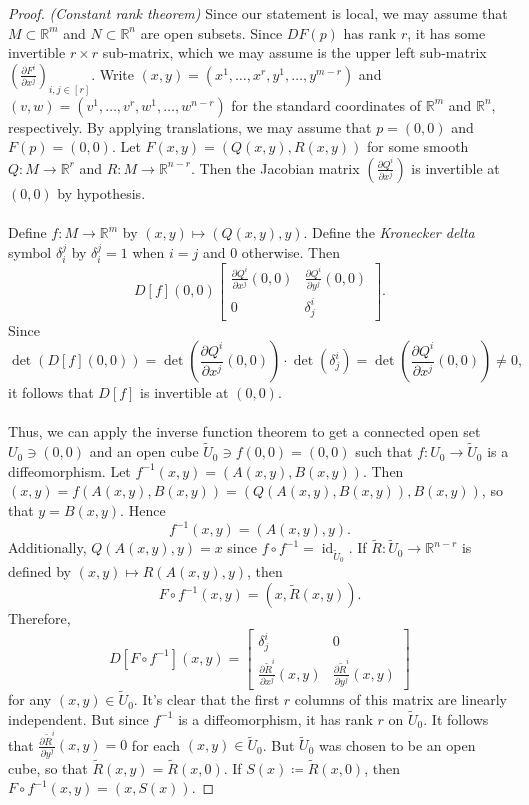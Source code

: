 \documentclass[10pt,letterpaper,cm]{nupset}
\theoremstyle{definition}
\theoremstyle{theorem}
\theoremstyle{remark}
\newcommand{\R}{\mathbb R}
\newcommand{\1}{\mathbf{1}}
\newcommand{\0}{\vec 0}
\DeclareMathOperator{\id}{id}
\begin{document}
\begin{proof}{\textit{(Constant rank theorem)}}
Since our statement is local, we may assume that $M\subset \R^m$ and $N\subset \R^n$ are open subsets. Since $DF(p)$ has rank $r$, it has some invertible $r\times r$ sub-matrix, which we may assume is the upper left sub-matrix $\left(\frac{\partial{F^i}}{\partial{x^j}}\right)_{i,j\in [r]}$. Write $(x,y) = (x^1, \ldots, x^r, y^1, \ldots, y^{m-r})$ and $(v,w) = (v^1, \ldots, v^r, w^1, \ldots, w^{n-r})$ for the standard coordinates of $\R^m$ and $\R^n$, respectively. By applying translations, we may assume that $p=(0,0)$ and $F(p)= (0,0)$. Let $F(x,y)= (Q(x,y), R(x,y))$ for some smooth $Q: M \to \R^r$ and $R: M \to \R^{n-r}$. Then the Jacobian matrix $\left(\frac{\partial{Q^i}}{\partial{x^j}} \right)$ is invertible at $(0,0)$ by hypothesis. 
\\ \\
Define $f : M \to \R^m$ by $(x,y) \mapsto (Q(x,y), y)$. Define the \textit{Kronecker delta} symbol $\delta_i^j$ by $\delta_i^j = 1$ when $i=j$ and $0$ otherwise.  Then $$D[f](0,0) \begin{bmatrix} \frac{\partial{Q^i}}{\partial{x^j}}(0,0) & \frac{\partial{Q^i}}{\partial{y^j}}(0,0) \\ 0 & \delta^i_j     \end{bmatrix}   .$$ Since $$\det(D[f](0,0)) = \det \left( \frac{\partial{Q^i}}{\partial{x^j}}(0,0) \right) \cdot \det(\delta^i_j) = \det \left( \frac{\partial{Q^i}}{\partial{x^j}}(0,0)  \right) \ne 0,$$ it follows that $D[f]$ is invertible at $(0,0)$. 
\\ \\Thus, we can apply the inverse function theorem to get a connected open set $U_0 \ni (0,0)$ and an open cube $\widetilde{U}_0 \ni f(0,0) = (0,0)$ such that $f: U_0 \to \widetilde{U}_0$ is a diffeomorphism.  Let $f^{-1}(x,y) =(A(x,y), B(x,y))$. Then $(x,y) = f(A(x,y), B(x,y)) = (Q(A(x,y), B(x,y)), B(x,y))$, so that $y = B(x,y)$. Hence $$f^{-1}(x,y) = (A(x,y), y).$$ Additionally, $Q(A(x,y), y)=x$ since $f\circ f^{-1} = \id_{\widetilde{U}_0}$. If $\widetilde{R} : \widetilde{U}_0 \to \R^{n-r}$ is defined by $(x,y) \mapsto R(A(x,y), y)$, then $$F\circ f^{-1}(x,y) = (x, \widetilde{R}(x,y)).$$ Therefore, $$D[F\circ f^{-1}](x,y)  =  \begin{bmatrix}    \delta^i_j & 0 \\ 
\frac{\partial{\widetilde{R}^i}}{\partial{x^j}}(x,y) & \frac{\partial{\widetilde{R}^i}}{\partial{y^j}}(x,y)    \end{bmatrix} $$ for any $(x,y) \in \widetilde{U}_0$. It's clear that the first $r$ columns of this matrix are linearly independent. But since $f^{-1}$ is a diffeomorphism, it has rank $r$ on $\widetilde{U}_0$. It follows that $ \frac{\partial{\widetilde{R}^i}}{\partial{y^j}}(x,y) =0$ for each $(x,y) \in \widetilde{U}_0$. But $\widetilde{U}_0$ was chosen to be an open cube, so that $\widetilde{R}(x,y) = \widetilde{R}(x,0)$. If $S(x) \coloneqq \widetilde{R}(x,0)$, then $F \circ f^{-1}(x,y) = (x, S(x))$. 

\end{proof}
\end{document}
